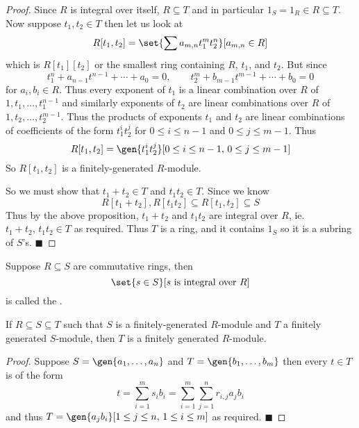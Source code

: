 \documentclass[10pt]{article}
\def\qed{%
    \ifmmode%
        \eqno\blacksquare%
    \else%
        \hskip1cm\allowbreak\hbox{}\nobreak\hfill$\blacksquare$%
    \fi%
}
\begin{document}
\begin{proof}

    Since $R$ is integral over itself, $R\subseteq T$ and in particular $1_S=1_R\in R\subseteq T$.
    Now suppose $t_1,t_2\in T$ then let us look at
    \[ R[t_1,t_2] = \set{\sum a_{m,n}t_1^mt_2^n}[a_{m,n}\in R] \]
    which is $R[t_1][t_2]$ or the smallest ring containing $R$, $t_1$, and $t_2$.
    But since
    \[ t_1^n + a_{n-1}t^{n-1} + \cdots + a_0 = 0,\qquad t_2^m +  b_{m-1}t^{m-1} + \cdots + b_0 = 0 \]
    for $a_i,b_i\in R$.
    Thus every exponent of $t_1$ is a linear combination over $R$ of $1,t_1,\dots,t_1^{n-1}$ and similarly exponents of $t_2$ are linear combinations over $R$ of $1,t_2,\dots,t_2^{m-1}$.
    Thus the products of exponents $t_1$ and $t_2$ are linear combinations of coefficients of the form $t_1^it_2^j$ for $0\leq i\leq n-1$ and $0\leq j\leq m-1$.
    Thus
    \[ R[t_1,t_2] = \gen{t_1^it_2^j}[0\leq i\leq n-1,\,0\leq j\leq m-1] \]
    So $R[t_1,t_2]$ is a finitely-generated $R$-module.

    So we must show that $t_1+t_2\in T$ and $t_1t_2\in T$.
    Since we know
    \[ R[t_1+t_2], R[t_1t_2]\subseteq R[t_1,t_2] \subseteq S \]
    Thus by the above proposition, $t_1+t_2$ and $t_1t_2$ are integral over $R$, ie. $t_1+t_2,\,t_1t_2\in T$ as required.
    Thus $T$ is a ring, and it contains $1_S$ so it is a subring of $S$'s.
    \qed

\end{proof}

\begin{defn*}

    Suppose $R\subseteq S$ are commutative rings, then
    \[ \set{s\in S}[s\text{ is integral over }R] \]
    is called the .

\end{defn*}

\begin{lemm*}

    If $R\subseteq S\subseteq T$ such that $S$ is a finitely-generated $R$-module and $T$ a finitely generated $S$-module, then $T$ is a finitely generated $R$-module.

\end{lemm*}

\begin{proof}

    Suppose $S=\gen{a_1,\dots,a_n}$ and $T=\gen{b_1,\dots,b_m}$ then every $t\in T$ is of the form
    \[ t = \sum_{i=1}^m s_ib_i = \sum_{i=1}^m\sum_{j=1}^n r_{i,j}a_jb_i \]
    and thus $T=\gen{a_jb_i}[1\leq j\leq n,\,1\leq i\leq m]$ as required.
    \qed

\end{proof}
\end{document}
